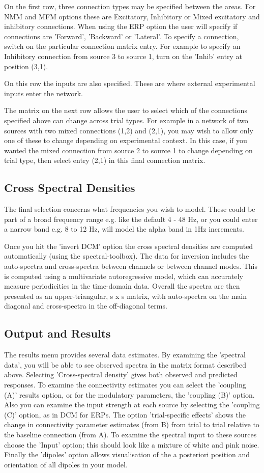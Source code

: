 On the first row, three connection types may be specified between the areas. For NMM and MFM options these are Excitatory, Inhibitory or Mixed excitatory and inhibitory connections. When using the ERP option the user will specify if connections are 'Forward', 'Backward' or 'Lateral'. To specify a connection, switch on the particular connection matrix entry. For example to specify an Inhibitory connection from source 3 to source 1, turn on the 'Inhib' entry at position (3,1).

On this row the inputs are also specified. These are where external experimental inputs enter the network.

The matrix on the next row allows the user to select which of the connections specified above can change across trial types. For example in a network of two sources with two mixed connections (1,2) and (2,1), you may wish to allow only one of these to change depending on experimental context. In this case, if you wanted the mixed connection from source 2 to source 1 to change depending on trial type, then select entry (2,1) in this final connection matrix.


\subsection{Cross Spectral Densities}
The final selection concerns what frequencies you wish to model. These could be part of a broad frequency range e.g. like the default 4 - 48 Hz, or you could enter a narrow band e.g. 8 to 12 Hz, will model the alpha band in 1Hz increments.

Once you hit the 'invert DCM' option the cross spectral densities are computed automatically (using the spectral-toolbox). The data for inversion includes the auto-spectra and cross-spectra between channels or between channel modes. This is computed using a multivariate autoregressive model, which can accurately measure periodicities in the time-domain data. Overall the spectra are then presented as an upper-triangular, s x s matrix, with auto-spectra on the main diagonal and cross-spectra in the off-diagonal terms.

\subsection{Output and Results}
The results menu provides several data estimates. By examining the 'spectral data', you will be able to see observed spectra in the matrix format described above. Selecting 'Cross-spectral density' gives both observed and predicted responses. To examine the connectivity estimates you can select the 'coupling (A)' results option, or for the modulatory parameters, the 'coupling (B)' option. Also you can examine the input strength at each source by selecting the 'coupling (C)' option, as in DCM for ERPs. The option 'trial-specific effects' shows the change in connectivity parameter estimates (from B) from trial to trial relative to the baseline connection (from A). To examine the spectral input to these sources choose the 'Input' option; this should look like a mixture of white and pink noise. Finally the 'dipoles' option allows visualisation of the a posteriori position and orientation of all dipoles in your model.

